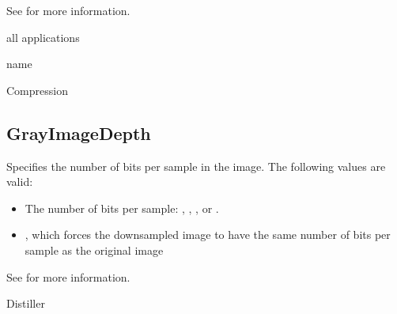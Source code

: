 \documentclass[letterpaper,12pt,english,openany,oneside]{sphinxmanual}
\begin{document}
See  for more information.

\label{\detokenize{PDF_Create_CommonSettings:supported-by-42}}

all applications

\label{\detokenize{PDF_Create_CommonSettings:type-42}}

name

\label{\detokenize{PDF_Create_CommonSettings:ui-name-31}}

Compression

\label{\detokenize{PDF_Create_CommonSettings:default-value-38}}

\begin{sphinxVerbatim}[commandchars=\\\{\}]
\end{sphinxVerbatim}




\subsection{GrayImageDepth}
\label{\detokenize{PDF_Create_CommonSettings:grayimagedepth}}
Specifies the number of bits per sample in the image. The following values are valid:
\begin{itemize}
\item {} 
The number of bits per sample:  ,  ,  , or  .

\item {} 
 , which forces the downsampled image to have the same number of bits per sample as the original image

\end{itemize}

See  for more information.

\label{\detokenize{PDF_Create_CommonSettings:supported-by-43}}

Distiller

\label{\detokenize{PDF_Create_CommonSettings:type-43}}
\end{document}
